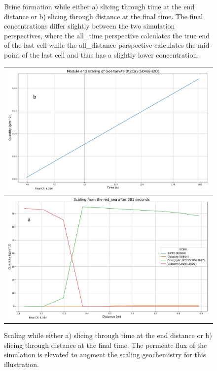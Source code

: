 \begin{figure}[t]
\begin{tabular}{c}
    \end{tabular}
    \caption{
        Brine formation while either a) slicing through time at the end distance or b) slicing  through distance at the final time. The final concentrations differ slightly between the two simulation perspectives, where the all\_time perspective calculates the true end of the last cell while the all\_distance perspective calculates the mid-point of the last cell and thus has a slightly lower concentration. 
    }
    \label{brine_perspectives}
\end{figure}

\begin{figure}[t]
    \centering
    \begin{tabular}{c}
        \includegraphics[width=\linewidth]{images/ROSSpy/case_studies/scaling_all_time_goergeyite.png} 
        \\ \midrule
        \includegraphics[width=\linewidth]{images/ROSSpy/case_studies/scaling_all_distance.png} 
    \end{tabular}
    \caption{
        Scaling while either a) slicing through time at the end distance or b) slicing  through distance at the final time. The permeate flux of the simulation is elevated to augment the scaling geochemistry for this illustration.
    }
    \label{scaling_perspectives}
\end{figure}

